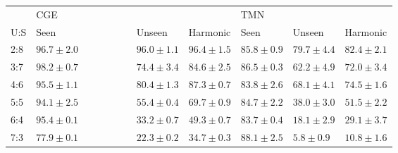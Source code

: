 \documentclass{article}
\begin{document}
\begin{table}[htb]
\begin{tabular}{llll|lll}
\hline
\textbf{}    & CGE~\citep{naeem2021learning}~~~~~~~~~~~~~     &                 &  &  TMN~\citep{purushwalkam2019task}  &             &            \\ 
U:S & Seen & Unseen & Harmonic & Seen & Unseen & Harmonic  \\ \hline
2:8 & $96.7 \pm 2.0$     & $96.0 \pm 1.1$       & $96.4 \pm 1.5$  & $85.8 \pm 0.9$ & $79.7 \pm 4.4$ & $82.4 \pm 2.1$   \\
3:7 & $98.2 \pm 0.7$     & $74.4 \pm 3.4$       & $84.6 \pm 2.5$ & $86.5 \pm 0.3$ & $62.2 \pm 4.9$ & $72.0 \pm 3.4$    \\
4:6 & $95.5 \pm 1.1$     & $80.4 \pm 1.3$       & $87.3 \pm 0.7$  & $83.8 \pm 2.6$ & $68.1 \pm 4.1$ & $74.5 \pm 1.6$    \\
5:5 & $94.1 \pm 2.5$     & $55.4 \pm 0.4$       & $69.7 \pm 0.9$  & $84.7 \pm 2.2 $ & $38.0 \pm 3.0$ & $51.5 \pm 2.2$   \\
6:4 & $95.4 \pm 0.1$     & $33.2 \pm 0.7$       & $49.3 \pm 0.7$  & $83.7 \pm 0.4$ & $18.1 \pm 2.9$ & $29.1 \pm 3.7$   \\
7:3 & $77.9 \pm 0.1$    &  $22.3 \pm 0.2$       & $34.7 \pm 0.3$  & $88.1 \pm 2.5$ & $5.8 \pm 0.9$ & $10.8 \pm 1.6$   \\ \hline
\end{tabular}

\end{table}
\end{document}
